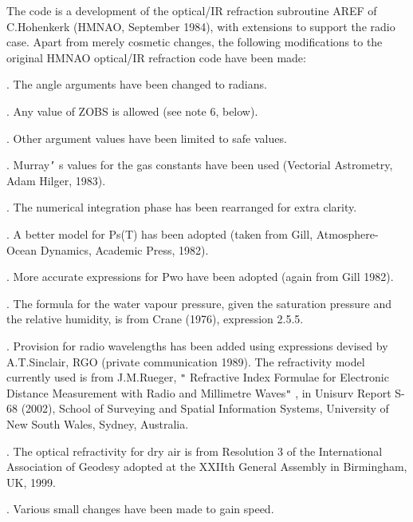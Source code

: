 \documentclass[twoside,11pt,nolof]{starlink}
\begin{document}
{{{         \sstitem
          The code is a development of the optical/IR refraction subroutine
         AREF of C.Hohenkerk (HMNAO, September 1984), with extensions to
         support the radio case.  Apart from merely cosmetic changes, the
         following modifications to the original HMNAO optical/IR refraction
         code have been made:

      }
      .  The angle arguments have been changed to radians.

      .  Any value of ZOBS is allowed (see note 6, below).

      .  Other argument values have been limited to safe values.

      .  Murray\texttt{'} s values for the gas constants have been used
         (Vectorial Astrometry, Adam Hilger, 1983).

      .  The numerical integration phase has been rearranged for
         extra clarity.

      .  A better model for Ps(T) has been adopted (taken from
         Gill, Atmosphere-Ocean Dynamics, Academic Press, 1982).

      .  More accurate expressions for Pwo have been adopted
         (again from Gill 1982).

      .  The formula for the water vapour pressure, given the
         saturation pressure and the relative humidity, is from
         Crane (1976), expression 2.5.5.

      .  Provision for radio wavelengths has been added using
         expressions devised by A.T.Sinclair, RGO (private
         communication 1989).  The refractivity model currently
         used is from J.M.Rueger, \texttt{"} Refractive Index Formulae for
         Electronic Distance Measurement with Radio and Millimetre
         Waves\texttt{"} , in Unisurv Report S-68 (2002), School of Surveying
         and Spatial Information Systems, University of New South
         Wales, Sydney, Australia.

      .  The optical refractivity for dry air is from Resolution 3 of
         the International Association of Geodesy adopted at the XXIIth
         General Assembly in Birmingham, UK, 1999.

      .  Various small changes have been made to gain speed.

      }}
\end{document}
